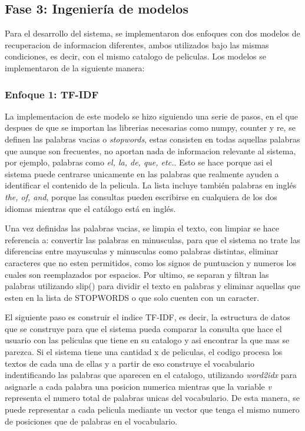 ﻿\subsection{Fase 3: Ingeniería de modelos}
Para el desarrollo del sistema, se implementaron dos enfoques con dos modelos de recuperacion de informacion diferentes, ambos utilizados bajo las mismas condiciones, es decir, con el mismo catalogo de peliculas. Los modelos se implementaron de la siguiente manera:

\subsubsection{Enfoque 1: TF-IDF}

La implementacion de este modelo se hizo siguiendo una serie de pasos, en el que despues de que se importan las librerias necesarias como numpy, counter y re, se definen las palabras vacias o \textit{stopwords}, estas consisten en todas aquellas palabras que aunque son frecuentes, no aportan nada de informacion relevante al sistema, por ejemplo, palabras como \textit{el, la, de, que, etc.}. Esto se hace porque asi el sistema puede centrarse unicamente en las palabras que realmente ayuden a identificar el contenido de la pelicula. La lista incluye también palabras en inglés \textit{the, of, and}, porque las consultas pueden escribirse en cualquiera de los dos idiomas mientras que el catálogo está en inglés.

Una vez definidas las palabras vacias, se limpia el texto, con limpiar se hace referencia a: convertir las palabras en minusculas, para que el sistema no trate las diferencias entre mayusculas y minusculas como palabras distintas, eliminar caracteres que no esten permitidos, como los signos de puntuacion y numeros los cuales son reemplazados por espacios. Por ultimo, se separan y filtran las palabras utilizando slip() para dividir el texto en palabras y eliminar aquellas que esten en la lista de STOPWORDS o que solo cuenten con un caracter. 

El siguiente paso es construir el indice TF-IDF, es decir, la estructura de datos que se construye para que el sistema pueda comparar la consulta que hace el usuario con las peliculas que tiene en su catalogo y asi encontrar la que mas se parezca. Si el sistema tiene una cantidad x de peliculas, el codigo procesa los textos de cada una de ellas y a partir de eso construye el vocabulario indentificando las palabras que aparecen en el catalogo, utilizando \textit{word2idx} para asignarle a cada palabra una posicion numerica mientras que la variable \textit{v} representa el numero total de palabras unicas del vocabulario. De esta manera, se puede representar a cada pelicula mediante un vector que tenga el mismo numero de posiciones que de palabras en el vocabulario.

